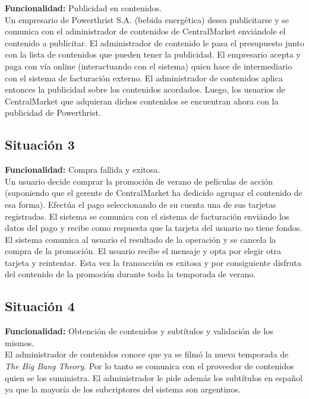 \documentclass[11pt, a4paper, spanish]{article}
\begin{document}
	\textbf{Funcionalidad:} Publicidad en contenidos.\\

        Un empresario de Powerthrist S.A. (bebida energ\'etica) desea publicitarse y se comunica con el administrador de contenidos de CentralMarket 
    envi\'andole el contenido a publicitar.
    El administrador de contenido le pasa el presupuesto junto con la lista de contenidos que pueden tener la publicidad.
    El empresario acepta y paga con v\'ia online (interactuando con el sistema) quien hace de intermediario con el sistema de facturaci\'on externo.
    El administrador de contenidos aplica entonces la publicidad sobre los contenidos acordados.
    Luego, los usuarios de CentralMarket que adquieran dichos contenidos se encuentran ahora con la publicidad de Powerthrist.

\subsection{Situaci\'on 3}

	\textbf{Funcionalidad:} Compra fallida y exitosa.\\

        Un usuario decide comprar la promoci\'on de verano de pel\'iculas de acci\'on (suponiendo que el gerente de CentralMarket ha dedicido agrupar el     
    contenido de esa forma). Efect\'ua el pago seleccionando de su cuenta una de sus tarjetas registradas. El sistema se comunica con el sistema de 
    facturaci\'on envi\'ando los datos del pago y recibe como respuesta que la tarjeta del usuario no tiene fondos. El sistema comunica al usuario el 
    resultado de la operaci\'on y se cancela la compra de la promoci\'on. El usuario recibe el mensaje y opta por elegir otra tarjeta y reintentar. Esta 
    vez la transacci\'on es exitosa y por consiguiente disfruta del contenido de la promoci\'on durante toda la temporada de verano.

\subsection{Situaci\'on 4}

	\textbf{Funcionalidad:} Obtenci\'on de contenidos y subt\'itulos y validaci\'on de los mismos.\\

        El administrador de contenidos conoce que ya se film\'o la nueva temporada de \emph{The Big Bang Theory}. Por lo tanto se comunica con el 
   proveedor de contenidos quien se los suministra. El administrador le pide adem\'as los subt\'itulos en espa\~{n}ol ya que la mayor\'ia de los subcriptores del 
   sistema son argentinos.
\end{document}
